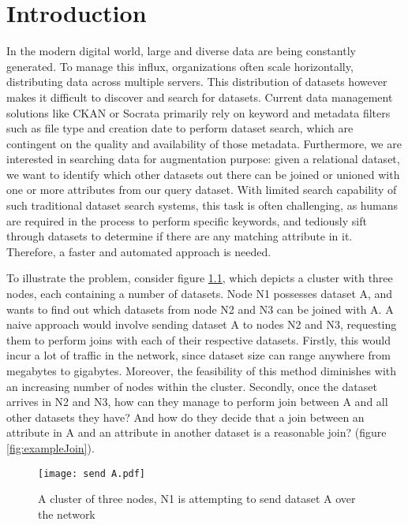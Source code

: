 


\chapter{Introduction}
\label{chap:introduction}
\pagestyle{plain}
\setcounter{page}{1}

In the modern digital world, large and diverse data are being constantly generated. To manage this influx, organizations often scale horizontally, distributing data across multiple servers. This distribution of datasets however makes it difficult to discover and search for datasets. Current data management solutions like CKAN or Socrata \cite{datasetSearchSurvey} primarily rely on keyword and metadata filters such as file type and creation date to perform dataset search, which are contingent on the quality and availability of those metadata. Furthermore, we are interested in searching data for augmentation purpose: given a relational dataset, we want to identify which other datasets out there can be joined or unioned with one or more attributes from our query dataset. With limited search capability of such traditional dataset search systems, this task is often challenging, as humans are required in the process to perform specific keywords, and tediously sift through datasets to determine if there are any matching attribute in it. Therefore, a faster and automated approach is needed.

To illustrate the problem, consider figure \ref{fig:sendA}, which depicts a cluster with three nodes, each containing a number of datasets. Node N1 possesses dataset A, and wants to find out which datasets from node N2 and N3 can be joined with A. A naive approach would involve sending dataset A to nodes N2 and N3, requesting them to perform joins with each of their respective datasets. Firstly, this would incur a lot of traffic in the network, since dataset size can range anywhere from megabytes to gigabytes. Moreover, the feasibility of this method diminishes with an increasing number of nodes within the cluster. Secondly, once the dataset arrives in N2 and N3, how can they manage to perform join between A and all other datasets they have? And how do they decide that a join between an attribute in A and an attribute in another dataset is a reasonable join? (figure \ref{fig:exampleJoin}).

\begin{figure}
    \centering
    \texttt{[image: send A.pdf]}
    \caption{A cluster of three nodes, N1 is attempting to send dataset A over the network}
    \label{fig:sendA}
\end{figure}


